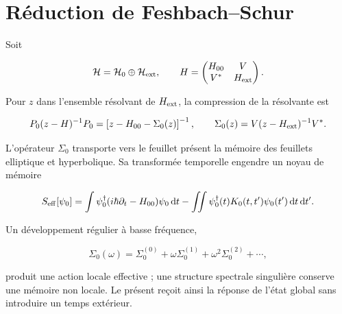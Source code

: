 \section{Réduction de Feshbach--Schur}

Soit

\[
\mathcal H=\mathcal H_0\oplus\mathcal H_{\rm ext},
\qquad
H=
\begin{pmatrix}
H_{00}&V\\ V^*&H_{\rm ext}
\end{pmatrix}.
\]

Pour \(z\) dans l'ensemble résolvant de \(H_{\rm ext}\), la compression de la
résolvante est

\begin{equation}
P_0(z-H)^{-1}P_0
=\left[z-H_{00}-\Sigma_0(z)\right]^{-1},
\qquad
\Sigma_0(z)=V(z-H_{\rm ext})^{-1}V^*.
\label{rm:eq:rm-feshbach-schur}
\end{equation}

L'opérateur \(\Sigma_0\) transporte vers le feuillet présent la mémoire des feuillets
elliptique et hyperbolique. Sa transformée temporelle engendre un noyau de
mémoire

\[
S_{\rm eff}[\psi_0]
=\int\psi_0^\dagger(i\hbar\partial_t-H_{00})\psi_0\,\mathrm dt
-\iint\psi_0^\dagger(t)K_0(t,t')\psi_0(t')\,\mathrm dt\,\mathrm dt'.
\]

Un développement régulier à basse fréquence,

\[
\Sigma_0(\omega)
=\Sigma_0^{(0)}+\omega\Sigma_0^{(1)}
+\omega^2\Sigma_0^{(2)}+\cdots,
\]

produit une action locale effective ; une structure spectrale singulière conserve
une mémoire non locale. Le présent reçoit ainsi la réponse de l'état global sans
introduire un temps extérieur.
